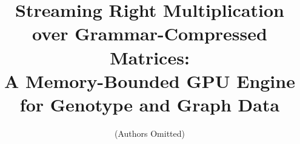 \documentclass[twoside,leqno,twocolumn]{article}
\begin{document}
\newcommand\relatedversion{}

\title{\large Streaming Right Multiplication over Grammar-Compressed Matrices:\\
 A Memory-Bounded GPU Engine for Genotype and Graph Data\relatedversion}


\author{(Authors Omitted)}


\date{}

\maketitle

\end{document}
